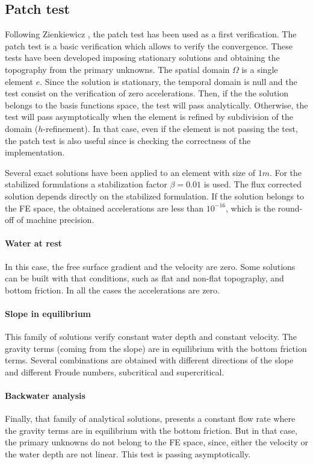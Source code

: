 \subsection{Patch test}


Following Zienkiewicz \cite{zien1}, the patch test has been used as a first verification. The patch test is a basic verification which allows to verify the convergence. These tests have been developed imposing stationary solutions and obtaining the topography from the primary unknowns. The spatial domain $\Omega$ is a single element $e$.
Since the solution is stationary, the temporal domain is null and the test consist on the verification of zero accelerations.
Then, if the the solution belongs to the basis functions space, the test will pass analytically.
Otherwise, the test will pass asymptotically when the element is refined by subdivision of the domain ($h$-refinement). In that case, even if the element is not passing the test, the patch test is also useful since is checking the correctness of the implementation.

Several exact solutions have been applied to an element with size of $1m$. For the stabilized formulations a stabilization factor $\beta=0.01$ is used. The flux corrected solution depends directly on the stabilized formulation. If the solution belongs to the FE space, the obtained accelerations are less than $10^{-16}$, which is the round-off of machine precision.

\paragraph{Water at rest}
In this case, the free surface gradient and the velocity are zero. Some solutions can be built with that conditions, such as flat and non-flat topography, and bottom friction. In all the cases the accelerations are zero.

\paragraph{Slope in equilibrium}
This family of solutions verify constant water depth and constant velocity. The gravity terms (coming from the slope) are in equilibrium with the bottom friction terms. Several combinations are obtained with different directions of the slope and different Froude numbers, subcritical and supercritical.

\paragraph{Backwater analysis}
Finally, that family of analytical solutions, presents a constant flow rate where the gravity terms are in equilibrium with the bottom friction. But in that case, the primary unknowns do not belong to the FE space, since, either the velocity or the water depth are not linear. This test is passing asymptotically.


